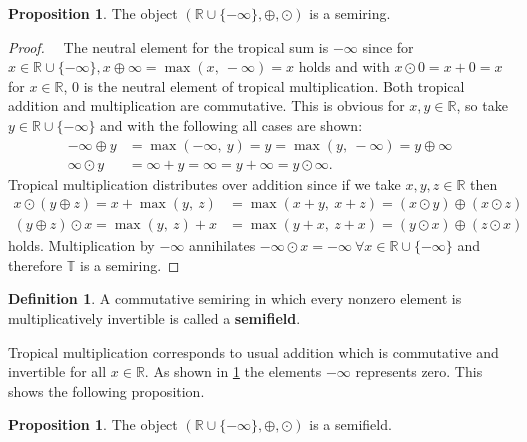 \documentclass{article}
\theoremstyle{definition}
\newtheorem{definition}[theorem]{Definition}
\newtheorem{proposition}[theorem]{Proposition}
\begin{document}
\begin{proposition}\hspace{1sp}\cite[p.~10]{maclagan2015introduction}
\label{prop:trop_semiring}
The object $( \mathbb{R} \cup \{- \infty \} , \oplus , \odot )$ is a semiring.
\end{proposition}
\begin{proof}
~\
The neutral element for the tropical sum is $- \infty$ since for $x \in \mathbb{R} \cup \{- \infty \}, x \oplus \infty = \max(x,\ - \infty) = x$ holds and with $x \odot 0 = x + 0 = x$ for $x \in \mathbb{R}$, $0$ is the neutral element of tropical multiplication. Both tropical addition and multiplication are commutative. This is obvious for $x,y \in \mathbb{R}$, so take $y \in \mathbb{R} \cup \{- \infty \}$ and with the following all cases are shown:
\begin{align*}
- \infty \oplus y &= \max (- \infty ,\ y) =   y = \max ( y,\ - \infty ) = y \oplus \infty \\
\infty \odot y &= \infty +y = \infty = y+ \infty = y \odot \infty.
\end{align*}
Tropical multiplication distributes over addition since if we take $x, y, z \in \mathbb{R}$ then
\begin{align*}
x \odot (y \oplus z) = x + \max (y,\ z) &=   \max (x + y,\ x + z) = (x \odot y) \oplus (x \odot z) \\
(y \oplus z) \odot x = \max (y,\ z) + x &=   \max (y + x,\ z + x) = (y \odot x) \oplus (z \odot x)
\end{align*}
holds. Multiplication by $- \infty$ annihilates $- \infty \odot x = - \infty \ \forall x \in  \mathbb{R} \cup \{- \infty \}$ and therefore $\mathbb{T}$ is a semiring.
\end{proof}

\begin{definition}\hspace{1sp}\cite{olia2020analysis}
A commutative semiring in which every nonzero element is multiplicatively invertible is called a \textbf{semifield}.
\end{definition}

Tropical multiplication corresponds to usual addition which is commutative and invertible for all $x \in \mathbb{R}$. As shown in \ref{prop:trop_semiring} the elements $-\infty$ represents zero. This shows the following proposition.
\begin{proposition}
The object $( \mathbb{R} \cup \{- \infty \} , \oplus , \odot )$ is a semifield.
\end{proposition}
\end{document}

